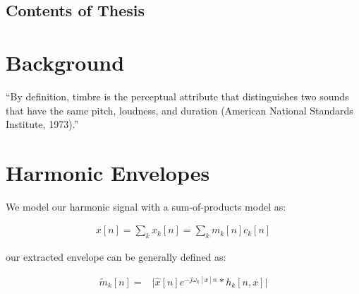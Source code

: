 \documentclass [11pt, proquest] {uwthesis}[2015/03/03]
\begin{document}
\section{Contents of Thesis}


\chapter{Background}

``By definition, timbre is the perceptual attribute that distinguishes two sounds that have the same pitch, loudness, and duration (American National Standards Institute, 1973).''



\chapter{Harmonic Envelopes}

We model our harmonic signal with a sum-of-products model as:

\begin{align}
\label{eq:sum_of_products}
x[n] = \sum\limits_k x_k[n] = \sum\limits_k m_k[n] c_k[n]
\end{align}

our extracted envelope can be generally defined as:

\begin{align}
\label{eq:envelope_extraction}
\tilde{m}_k[n] =& \Big| \widehat{x}[n]e^{-j \omega_k[x]n} * h_k[n,x]  \Big|
\end{align}
\end{document}

